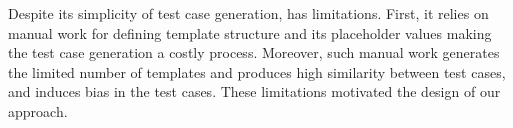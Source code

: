 Despite its simplicity of test case generation, \Cklst has
limitations. First, it relies on manual work for defining template
structure and its placeholder values making the test case
generation a costly process. Moreover, such
manual work generates the limited number of templates and produces high similarity between test cases, and induces bias in the test cases. These limitations motivated the design of our approach.


\begin{figure}[hbp!]
 \centering
 
 \vspace{-10pt}
 \caption{\CklstTemplateFigCaption}
 \vspace{-10pt}
\end{figure}